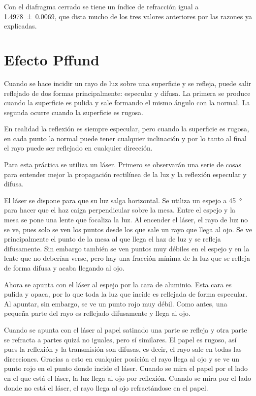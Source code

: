 \documentclass[12pt]{article}
\numberwithin{table}{section}
\numberwithin{figure}{section}
\numberwithin{equation}{section}
\begin{document}
Con el diafragma cerrado se tiene un índice de refracción igual a \num{1.4978\pm0.0069}, que dista mucho de los tres valores anteriores por las razones ya explicadas.

\section{Efecto Pffund}
Cuando se hace incidir un rayo de luz sobre una superficie y se refleja, puede salir reflejado de dos formas principalmente: especular y difusa. La primera se produce cuando la superficie es pulida y sale formando el mismo ángulo con la normal. La segunda ocurre cuando la superficie es rugosa.

En realidad la reflexión es siempre especular, pero cuando la superficie es rugosa, en cada punto la normal puede tener cualquier inclinación y por lo tanto al final el rayo puede ser reflejado en cualquier dirección.

Para esta práctica se utiliza un láser. Primero se observarán una serie de cosas para entender mejor la propagación rectilínea de la luz y la reflexión especular y difusa.

El láser se dispone para que su luz salga horizontal. Se utiliza un espejo a \SI{45}{\degree} para hacer que el haz caiga perpendicular sobre la mesa. Entre el espejo y la mesa se pone una lente que focaliza la luz. Al encender el láser, el rayo de luz no se ve, pues solo se ven los puntos desde los que sale un rayo que llega al ojo. Se ve principalmente el punto de la mesa al que llega el haz de luz y se refleja difusamente. Sin embargo también se ven puntos muy débiles en el espejo y en la lente que no deberían verse, pero hay una fracción mínima de la luz que se refleja de forma difusa y acaba llegando al ojo.

Ahora se apunta con el láser al espejo por la cara de aluminio. Esta cara es pulida y opaca, por lo que toda la luz que incide es reflejada de forma especular. Al apuntar, sin embargo, se ve un punto rojo muy débil. Como antes, una pequeña parte del rayo es reflejado difusamente y llega al ojo.

Cuando se apunta con el láser al papel satinado una parte se refleja y otra parte se refracta a partes quizá no iguales, pero sí similares. El papel es rugoso, así pues la reflexión y la transmisión son difusas, es decir, el rayo sale en todas las direcciones. Gracias a esto en cualquier posición el rayo llega al ojo y se ve un punto rojo en el punto donde incide el láser. Cuando se mira el papel por el lado en el que está el láser, la luz llega al ojo por reflexión. Cuando se mira por el lado donde no está el láser, el rayo llega al ojo refractándose en el papel.
\end{document}
